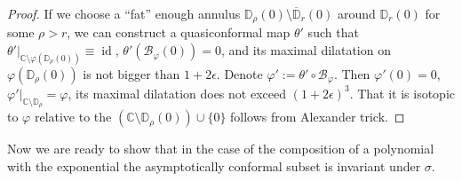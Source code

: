 \documentclass[10pt,reqno,a4paper]{amsart}
\numberwithin{figure}{section}
\numberwithin{equation}{section}
\newcommand{\id}{\operatorname{id}}
\begin{document}
\begin{proof}
	If we choose a ``fat'' enough annulus $ \mathbb{D}_\rho(0)\setminus\overline{\mathbb{D}}_r(0) $ around $ \mathbb{D}_r(0) $ for some $\rho>r$, we can construct a quasiconformal map $ \theta' $ such that $ \theta'|_{\mathbb{C}\setminus\varphi(\mathbb{D}_\rho(0))} \equiv\id$, $ \theta'(\mathcal{B}_\varphi(0))=0$, and its maximal dilatation on $ \varphi(\mathbb{D}_\rho(0)) $ is not bigger than $1+2\epsilon $. Denote $ \varphi':=\theta'\circ \mathcal{B}_\varphi $. Then $ \varphi'(0)=0 $, $ \varphi'|_{\mathbb{C}\setminus\mathbb{D}_\rho}=\varphi $, its maximal dilatation does not exceed $ (1+2\epsilon)^3 $. That it is isotopic to $\varphi$ relative to the $ (\mathbb{C}\setminus\mathbb{D}_\rho(0)) \cup \{0\} $ follows from Alexander trick.
\end{proof}

Now we are ready to show that in the case of the composition of a polynomial with the exponential the asymptotically conformal subset is invariant under $\sigma$.
\end{document}
